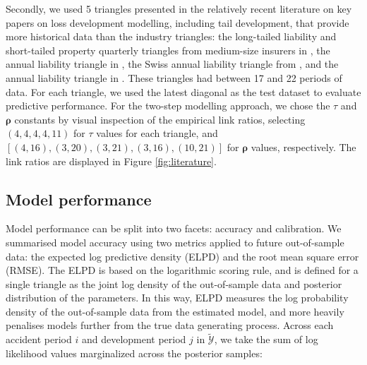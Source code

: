 Secondly, we used 5
triangles presented in the
relatively recent literature on key
papers on loss development
modelling,
including tail development, that provide more
historical data than the industry triangles:
the long-tailed liability and short-tailed property 
quarterly triangles from medium-size insurers
in \cite{balona2022}, the annual liability triangle in \cite{merz2015},
the Swiss annual liability triangle from \cite{gisler2009},
and the annual liability triangle in \cite{verrall2012}.
These triangles had between 17 and 22 periods of
data. For each triangle, we used the latest diagonal as the
test dataset to evaluate predictive performance.
For the two-step modelling approach, we chose the
$\tau$ and $\bm{\rho}$ constants
by visual inspection of the empirical link ratios,
selecting $(4, 4, 4, 4, 11)$ for $\tau$ values
for each triangle,
and $[(4, 16), (3, 20), (3, 21), (3, 16), (10, 21)]$
for $\bm{\rho}$ values, respectively.
The link ratios are displayed in Figure \ref{fig:literature}.

\subsection{Model performance}
Model performance can be split into two facets:
accuracy and calibration.
We summarised model accuracy using two metrics
applied to future out-of-sample data: the expected
log predictive density (ELPD) and the root mean
square error (RMSE). 
The ELPD \citep{vehtari2017} is based on the logarithmic scoring
rule, and is defined for a single triangle
as the joint log density of the out-of-sample
data and posterior distribution of the parameters. 
In this way, ELPD measures the log probability density
of the out-of-sample data from the estimated model,
and more heavily
penalises models further from
the true data generating process.
Across each accident period $i$ and development
period $j$ in $\mathcal{\tilde{Y}}$, we take the
sum of log likelihood values marginalized across the posterior
samples:

